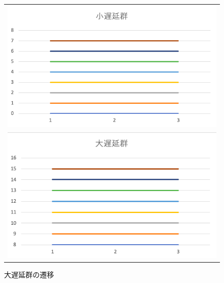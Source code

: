 \begin{figure}[htb]
\begin{center}
\begin{tabular}{c}

  \begin{minipage}[htb]{\linewidth}
  \begin{center}
  \includegraphics[width=12cm]{images/7/4.png}
  \caption{小遅延群の推移}
  \label{fig:4}
  \end{center}
  \end{minipage}
  
  \\
  
  \begin{minipage}[htb]{\linewidth}
  \begin{center}
  \includegraphics[width=12cm]{images/7/5.png}
  \caption{大遅延群の遷移}
  \label{fig:5}
  \end{center}
  \end{minipage}

\end{tabular}
\end{center}
\end{figure}

